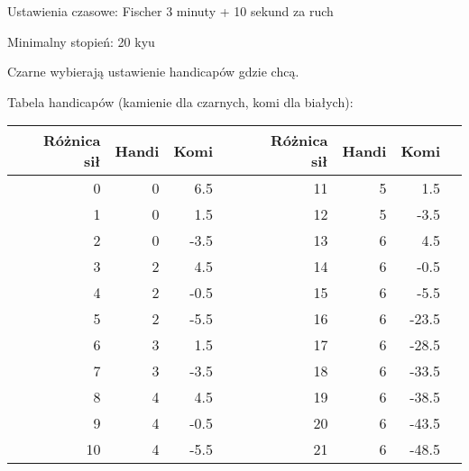 



Ustawienia czasowe: Fischer 3 minuty + 10 sekund za ruch

Minimalny stopień: 20 kyu

Czarne wybierają ustawienie handicapów gdzie chcą.

Tabela handicapów (kamienie dla czarnych, komi dla białych):

\bigskip

\setlength{\extrarowheight}{7pt}
\begin{tabularx}{\textwidth}{| X r r r X | X r r r X |}
\hline
& Różnica sił & Handi & Komi & & & Różnica sił & Handi &  Komi & \\ \hline
&           0 &     0 &  6.5 & & &          11 &     5 &   1.5 & \\ \hline
&           1 &     0 &  1.5 & & &          12 &     5 &  -3.5 & \\ \hline
&           2 &     0 & -3.5 & & &          13 &     6 &   4.5 & \\ \hline
&           3 &     2 &  4.5 & & &          14 &     6 &  -0.5 & \\ \hline
&           4 &     2 & -0.5 & & &          15 &     6 &  -5.5 & \\ \hline
&           5 &     2 & -5.5 & & &          16 &     6 & -23.5 & \\ \hline
&           6 &     3 &  1.5 & & &          17 &     6 & -28.5 & \\ \hline
&           7 &     3 & -3.5 & & &          18 &     6 & -33.5 & \\ \hline
&           8 &     4 &  4.5 & & &          19 &     6 & -38.5 & \\ \hline
&           9 &     4 & -0.5 & & &          20 &     6 & -43.5 & \\ \hline
&          10 &     4 & -5.5 & & &          21 &     6 & -48.5 & \\ \hline
\end{tabularx}


